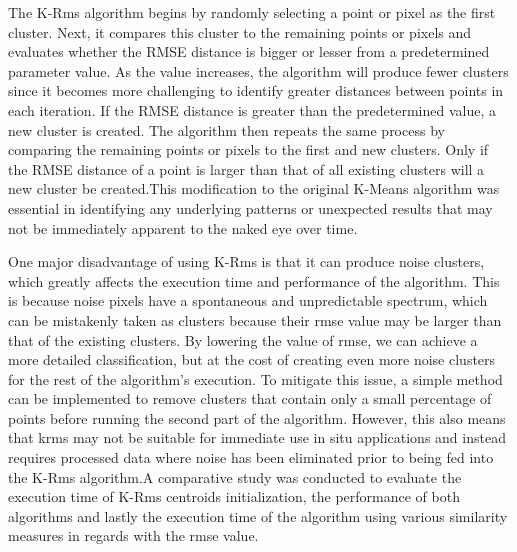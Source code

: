 \documentclass{article}
\begin{document}
{                    The K-Rms algorithm begins by randomly selecting a point or pixel as the first cluster. Next, it compares this cluster to the remaining points or pixels and evaluates whether the RMSE distance is bigger or lesser from a predetermined parameter value. As the value increases, the algorithm will produce fewer clusters since it becomes more challenging to identify greater distances between points in each iteration. If the RMSE distance is greater than the predetermined value, a new cluster is created. The algorithm then repeats the same process by comparing the remaining points or pixels to the first and new clusters. Only if the RMSE distance of a point is larger than that of all existing clusters will a new cluster be created.This modification to the original K-Means algorithm was essential in identifying any underlying patterns or unexpected results that may not be immediately apparent to the naked eye over time.\par
                    \newpage
                    One major disadvantage of using K-Rms is that it can produce noise clusters, which greatly affects the execution time and performance of the algorithm. This is because noise pixels have a spontaneous and unpredictable spectrum, which can be mistakenly taken as clusters because their rmse value may be larger than that of the existing clusters. By lowering the value of rmse, we can achieve a more detailed classification, but at the cost of creating even more noise clusters for the rest of the algorithm's execution. To mitigate this issue, a simple method can be implemented to remove clusters that contain only a small percentage of points before running the second part of the algorithm. However, this also means that krms may not be suitable for immediate use in situ applications and instead requires processed data where noise has been eliminated prior to being fed into the K-Rms algorithm.A comparative study was conducted to evaluate the execution time of K-Rms centroids initialization,  the performance of both algorithms and lastly the execution time of the algorithm using various similarity measures in regards with the rmse value.\par
                    \vspace*{2\baselineskip}
                    
}
\end{document}
